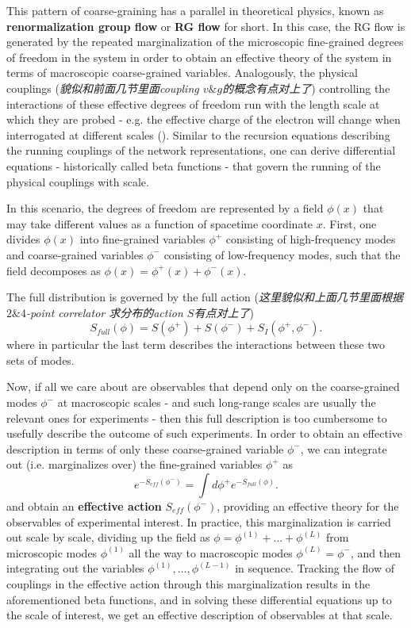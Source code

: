 This pattern of coarse-graining has a parallel in theoretical physics, known as 
\textbf{renormalization group flow} or \textbf{RG flow} for short. In this case, 
the RG flow is generated by the repeated marginalization of the microscopic fine-grained 
degrees of freedom in the system in order to obtain an effective theory of the system 
in terms of macroscopic coarse-grained variables. Analogously, the physical couplings
(\emph{貌似和前面几节里面coupling $v\&g$的概念有点对上了}) 
controlling the interactions of these effective degrees of freedom run with the 
length scale at which they are probed - e.g. the effective charge of the electron 
will change when interrogated at different scales (). 
Similar to the recursion equations 
describing the running couplings of the network representations, one can derive 
differential equations - historically called beta functions - that govern the running 
of the physical couplings with scale.

In this scenario, the degrees of freedom are represented by a field $\phi(x)$ 
that may take different values as a function of spacetime coordinate $x$. 
First, one divides $\phi(x)$ into fine-grained variables $\phi^+$ consisting of 
high-frequency modes and coarse-grained variables $\phi^-$ consisting of 
low-frequency modes, such that the field decomposes as $\phi(x) = \phi^+(x) + \phi^-(x)$. 

The full distribution is governed by the full action (\emph{这里貌似和上面几节里面根据
$2\&4$-point correlator 求分布的action $S$有点对上了})
\begin{equation}
    S_{full}(\phi) = S(\phi^+) + S(\phi^-) + S_I(\phi^+, \phi^-).
\end{equation}
where in particular the last term describes the interactions between these two sets 
of modes.

Now, if all we care about are observables that depend only on the 
coarse-grained modes $\phi^-$ at macroscopic scales - and such long-range 
scales are usually the relevant ones for experiments - then this full description 
is too cumbersome to usefully describe the outcome of such experiments. 
In order to obtain an effective description in terms of only these coarse-grained variable 
$\phi^-$, we can integrate out (i.e. marginalizes over) the fine-grained variables 
$\phi^+$ as 
\begin{equation}
    e^{-S_{eff}(\phi^-)} = \int d\phi^+ e^{-S_{full}(\phi)}.
    \label{eq:ch4_int_eff}
\end{equation}
and obtain an \textbf{effective action} $S_{eff}(\phi^−)$, providing an effective theory 
for the observables of experimental interest. In practice, this marginalization is carried 
out scale by scale, dividing up the field as $\phi = \phi^{(1)} + . . . + \phi^{(L)}$ 
from microscopic modes $\phi^{(1)}$ all the way to macroscopic modes $\phi^{(L)} = \phi^−$,
 and then integrating out the variables $\phi^{(1)}, . . . , \phi^{(L−1)}$ in sequence. 
 Tracking the flow of couplings in the effective action through this marginalization 
 results in the aforementioned beta functions, and in solving these differential 
 equations up to the scale of interest, we get an effective description of 
 observables at that scale. 

